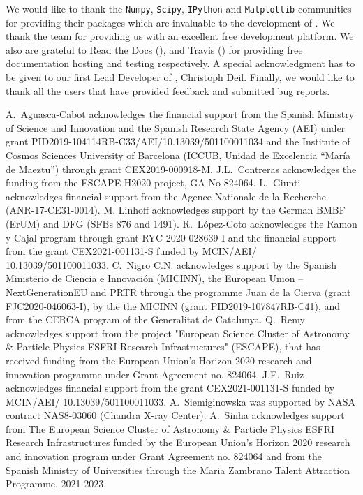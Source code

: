 \documentclass[longauth]{aa}
\begin{document}
\begin{acknowledgements}

	We would like to thank the \texttt{Numpy}, \texttt{Scipy}, \texttt{IPython} and
	\texttt{Matplotlib} communities for providing their packages which are
	invaluable to the development of \gammapy. We thank the \github team for
	providing us with an excellent free development platform. We also are grateful
	to Read the Docs (\ReadthedocsUrl), and Travis (\TravisUrl) for providing free
	documentation hosting and testing respectively. Α special acknowledgment has to be given
	to our first Lead Developer of \gammapy, Christoph Deil. Finally, we would like to thank
	all the \gammapy users that have provided feedback and submitted bug reports.

	A.~Aguasca-Cabot acknowledges the financial support from the Spanish Ministry of Science and Innovation
	and the Spanish Research State Agency (AEI) under grant PID2019-104114RB-C33/AEI/10.13039/501100011034
	and the Institute of Cosmos Sciences University of Barcelona (ICCUB, Unidad de Excelencia “María de Maeztu”)
	through grant CEX2019-000918-M. J.L.~Contreras acknowledges the funding from the ESCAPE H2020 project, GA No 824064.
	L.~Giunti acknowledges financial support from the Agence Nationale de la Recherche (ANR-17-CE31-0014). M. Linhoff
	acknowledges support by the German BMBF (ErUM) and DFG (SFBs 876 and 1491).
	R.~López-Coto acknowledges the Ramon y Cajal program through grant RYC-2020-028639-I and the financial support
	from the grant CEX2021-001131-S funded by MCIN/AEI/ 10.13039/501100011033. C.~Nigro C.N. acknowledges support by
	the Spanish Ministerio de Ciencia e Innovación (MICINN), the European Union – NextGenerationEU and PRTR  through
	the programme Juan de la Cierva (grant FJC2020-046063-I), by the the MICINN (grant PID2019-107847RB-C41), and from
	the CERCA program of the Generalitat de Catalunya. Q.~Remy acknowledges support from the project "European Science
	Cluster of Astronomy \& Particle Physics ESFRI Research Infrastructures" (ESCAPE), that has received funding from
	the European Union’s Horizon 2020 research and innovation programme under Grant Agreement no. 824064. J.E.~Ruiz
	acknowledges financial support from the grant
	CEX2021-001131-S funded by MCIN/AEI/ 10.13039/501100011033. A.~Siemiginowska was supported by NASA contract
	NAS8-03060 (Chandra X-ray Center). A.~Sinha acknowledges support from The European Science Cluster of Astronomy \&
	Particle Physics ESFRI Research Infrastructures  funded by the European Union’s Horizon 2020 research and
	innovation program under Grant Agreement no. 824064 and from the Spanish Ministry of Universities through the
	Maria Zambrano Talent Attraction Programme, 2021-2023.

\end{acknowledgements}
\end{document}

